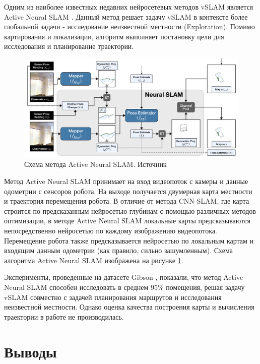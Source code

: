 \documentclass{mipt-thesis-ms}
\begin{document}
	Одним из наиболее известных недавних нейросетевых методов vSLAM является Active Neural SLAM \cite{chaplot2020learning}. Данный метод решает задачу vSLAM в контексте более глобальной задачи - исследование неизвестной местности (Exploration). Помимо картирования и локализации, алгоритм выполняет постановку цели для исследования и планирование траектории.
	
	\begin{figure}
		\includegraphics[width=1.0\textwidth]{img/ans_scheme.png}
		\caption{Схема метода Active Neural SLAM. Источник \cite{chaplot2020learning}}
		\label{figure_active_neural_slam}
	\end{figure}
		
	Метод Active Neural SLAM принимает на вход видеопоток с камеры и данные одометрии с сенсоров робота. На выходе получается двумерная карта местности и траектория перемещения робота. В отличие от метода CNN-SLAM, где карта строится по предсказанным нейросетью глубинам с помощью различных методов оптимизации, в методе Active Neural SLAM локальные карты предсказываются непосредственно нейросетью по каждому изображению видеопотока. Перемещение робота также предсказывается нейросетью по локальным картам и входящим данным одометрии (как правило, сильно зашумленным). Схема алгоритма Active Neural SLAM изображена на рисунке \ref{figure_active_neural_slam}.
	
	Эксперименты, проведенные на датасете Gibson \cite{xia2018gibson}, показали, что метод Active Neural SLAM способен исследовать в среднем 95\% помещения, решая задачу vSLAM совместно с задачей планирования маршрутов и исследования неизвестной местности. Однако оценка качества построения карты и вычисления траектории в работе \cite{chaplot2020learning} не производилась.
	
	\section{Выводы}
	
\end{document}
